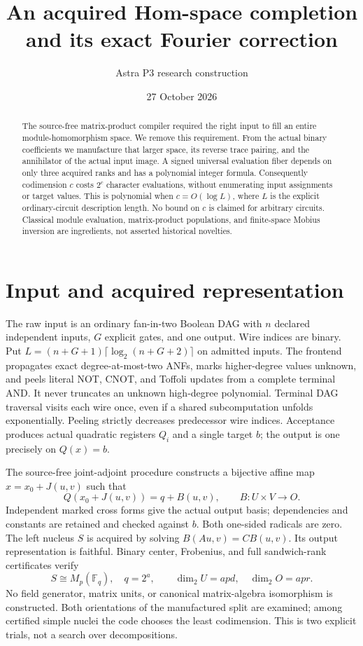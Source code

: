 \documentclass[11pt]{article}
\title{An acquired Hom-space completion and its exact Fourier correction}
\author{Astra P3 research construction}\date{27 October 2026}
\newcommand{\F}{\mathbb F}\newcommand{\Hom}{\operatorname{Hom}}
\begin{document}
\maketitle
\begin{abstract}
The source-free matrix-product compiler required the right input to fill an
entire module-homomorphism space. We remove this requirement. From the actual
binary coefficients we manufacture that larger space, its reverse trace
pairing, and the annihilator of the actual input image. A signed universal
evaluation fiber depends on only three acquired ranks and has a polynomial
integer formula. Consequently codimension $c$ costs $2^c$ character evaluations,
without enumerating input assignments or target values. This is polynomial
when $c=O(\log L)$, where $L$ is the explicit ordinary-circuit description
length. No bound on $c$ is claimed for arbitrary circuits. Classical module
evaluation, matrix-product populations, and finite-space Mobius inversion are
ingredients, not asserted historical novelties.
\end{abstract}

\section{Input and acquired representation}
The raw input is an ordinary fan-in-two Boolean DAG with $n$ declared independent
inputs, $G$ explicit gates, and one output. Wire indices are binary. Put
$L=(n+G+1)\lceil\log_2(n+G+2)\rceil$ on admitted inputs. The frontend
propagates exact degree-at-most-two ANFs, marks higher-degree values unknown,
and peels literal NOT, CNOT, and Toffoli updates from a complete terminal AND.
It never truncates an unknown high-degree polynomial. Terminal DAG traversal
visits each wire once, even if a shared subcomputation unfolds exponentially.
Peeling strictly decreases predecessor wire indices. Acceptance produces
actual quadratic registers $Q_i$ and a single target $b$; the output is one
precisely on $Q(x)=b$.

The source-free joint-adjoint procedure constructs a bijective affine map
$x=x_0+J(u,v)$ such that
\[
 Q(x_0+J(u,v))=q+B(u,v),\qquad B:U\times V\longrightarrow O.
\]
Independent marked cross forms give the actual output basis; dependencies and
constants are retained and checked against $b$. Both one-sided radicals are
zero. The left nucleus $S$ is acquired by solving
$B(Au,v)=C B(u,v)$. Its output representation is faithful. Binary center,
Frobenius, and full sandwich-rank certificates verify
\[
 S\cong M_p(\F_q),\quad q=2^a,\qquad
 \dim_2U=apd,\quad \dim_2O=apr.
\]
No field generator, matrix units, or canonical matrix-algebra isomorphism is
constructed. Both orientations of the manufactured split are examined; among
certified simple nuclei the code chooses the least codimension. This is two
explicit trials, not a search over decompositions.
\end{document}
